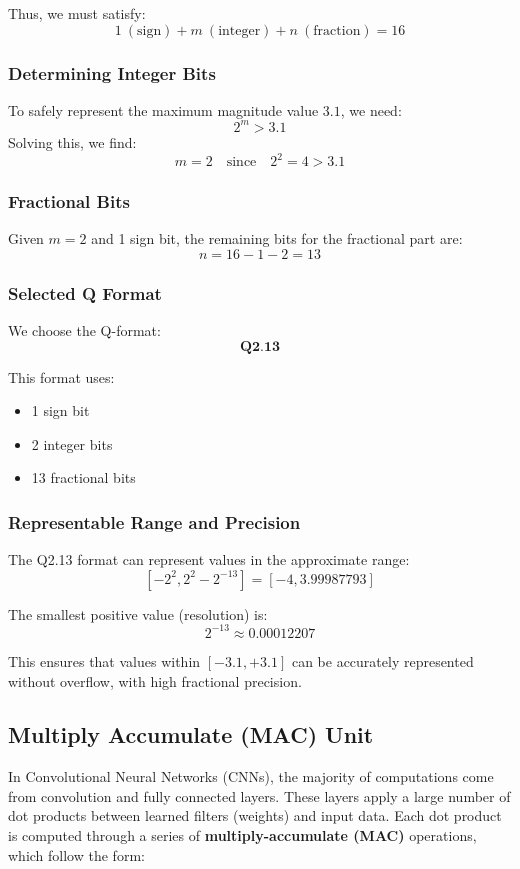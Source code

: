 \documentclass{article}
\begin{document}
Thus, we must satisfy:
\[
1~(\text{sign}) + m~(\text{integer}) + n~(\text{fraction}) = 16
\]

\subsubsection*{Determining Integer Bits}

To safely represent the maximum magnitude value \(3.1\), we need:
\[
2^m > 3.1
\]
Solving this, we find:
\[
m = 2 \quad \text{since} \quad 2^2 = 4 > 3.1
\]

\subsubsection*{Fractional Bits}

Given \(m = 2\) and 1 sign bit, the remaining bits for the fractional part are:
\[
n = 16 - 1 - 2 = 13
\]

\subsubsection*{Selected Q Format}

We choose the Q-format:
\[
\textbf{Q2.13}
\]

This format uses:
\begin{itemize}
  \item 1 sign bit
  \item 2 integer bits
  \item 13 fractional bits
\end{itemize}

\subsubsection*{Representable Range and Precision}

The Q2.13 format can represent values in the approximate range:
\[
[-2^2, 2^2 - 2^{-13}] = [-4, 3.99987793]
\]

The smallest positive value (resolution) is:
\[
2^{-13} \approx 0.00012207
\]

This ensures that values within \([-3.1, +3.1]\) can be accurately represented without overflow, with high fractional precision.
\subsection{Multiply Accumulate (MAC) Unit}

In Convolutional Neural Networks (CNNs), the majority of computations come from convolution and fully connected layers. These layers apply a large number of dot products between learned filters (weights) and input data. Each dot product is computed through a series of \textbf{multiply-accumulate (MAC)} operations, which follow the form:
\end{document}
